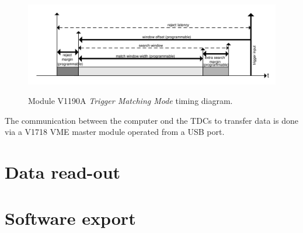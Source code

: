     \begin{figure}
		\centering
		\includegraphics[width = 1.25\plotwidth]{fig/chapt5/V1190A-TMM.png}\\
		\caption{\label{fig:V1190A-TMM} Module V1190A \textit{Trigger Matching Mode} timing diagram.}
	\end{figure}
	
	The communication between the computer ond the TDCs to transfer data is done via a V1718 VME master module operated from a USB port. 

\section{Data read-out}

\section{Software export}


\clearpage{\pagestyle{empty}\cleardoublepage}
